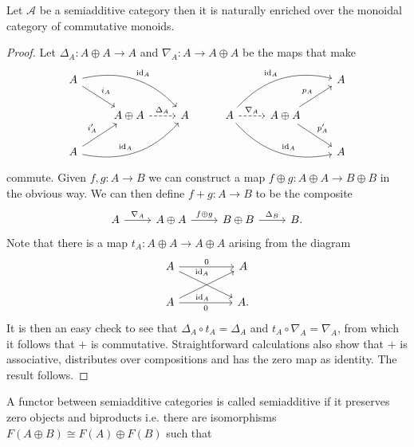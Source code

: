 \documentclass{memoir}
\begin{document}
\begin{thm}
    Let $\mathcal A$ be a semiadditive category then it is naturally enriched over the monoidal category of commutative monoids.
\end{thm}
\begin{proof}
    Let $\Delta_A:A\oplus A\to A$ and $\nabla_A:A\to A\oplus A$ be the maps that make
    \begin{equation}
        \begin{tikzcd}
            A \arrow[dr,"i_A"] \arrow[drr,bend left=30,"\id_A"] & & & & & A \\
                                                                & A\oplus A \arrow[r,dashed,"\Delta_A"] & A & A \arrow[r,dashed,"\nabla_A"] \arrow[urr,bend left=30,"\id_A"] \arrow[drr,bend right=30,"\id_A"] & A\oplus A \arrow[dr,"p_A'"] \arrow[ur,"p_A"] & \\
            A \arrow[ru,"i_A'"] \arrow[urr,bend right=30,"\id_A"] & & & & & A
        \end{tikzcd}
    \end{equation}
    commute.
    Given $f,g:A\to B$ we can construct a map $f\oplus g: A\oplus A\to B\oplus B$ in the obvious way.
    We can then define $f+g:A\to B$ to be the composite 
    \begin{equation}
        \begin{tikzcd}
            A \arrow[r,"\nabla_A"] & A \oplus A \arrow[r,"f\oplus g"] & B \oplus B \arrow[r,"\Delta_B"] & B.
        \end{tikzcd}
    \end{equation}
    Note that there is a map $t_A:A\oplus A\to A\oplus A$ arising from the diagram
    \begin{equation}
        \begin{tikzcd}[column sep = huge]
            A \arrow[r,"0"] \arrow[dr,near start,"\id_A"] & A \\
            A \arrow[r,swap,"0"] \arrow[ur,near start,swap,"\id_A"] & A.
        \end{tikzcd}
    \end{equation}
    It is then an easy check to see that $\Delta_A\circ t_A = \Delta_A$ and $t_A\circ \nabla_A = \nabla_A$, from which it follows that $+$ is commutative.
    Straightforward calculations also show that $+$ is associative, distributes over compositions and has the zero map as identity.
    The result follows.
\end{proof}
A functor between semiadditive categories is called semiadditive if it preserves zero objects and biproducts i.e. there are isomorphisms $F(A\oplus B) \cong F(A)\oplus F(B)$ such that 
\end{document}
